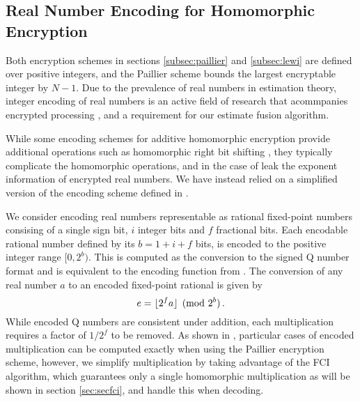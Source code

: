 \documentclass[letterpaper, 10 pt, conference]{ieeeconf}  %
\begin{document}
\subsection{Real Number Encoding for Homomorphic Encryption} \label{subsec:encoding}
Both encryption schemes in sections \ref{subsec:paillier} and \ref{subsec:lewi} are defined over positive integers, and the Paillier scheme bounds the largest encryptable integer by $N-1$. Due to the prevalence of real numbers in estimation theory, integer encoding of real numbers is an active field of research that acommpanies encrypted processing \cite{ziadCryptoImgPrivacyPreserving2016,farokhiSecurePrivateControl2017,cheonHomomorphicEncryptionArithmetic2017}, and a requirement for our estimate fusion algorithm. 

While some encoding schemes for additive homomorphic encryption provide additional operations such as homomorphic right bit shifting \cite{ziadCryptoImgPrivacyPreserving2016}, they typically complicate the homomorphic operations, and in the case of \cite{ziadCryptoImgPrivacyPreserving2016} leak the exponent information of encrypted real numbers. We have instead relied on a simplified version of the encoding scheme defined in \cite{farokhiSecurePrivateControl2017}. 

We consider encoding real numbers representable as rational fixed-point numbers consising of a single sign bit, $i$ integer bits and $f$ fractional bits. Each encodable rational number defined by its $b=1+i+f$ bits, is encoded to the positive integer range $[0,2^b)$. This is computed as the conversion to the signed Q number format \cite{oberstarFixedPointRepresentationFractional2007} and is equivalent to the encoding function from \cite{farokhiSecurePrivateControl2017}. The conversion of any real number $a$ to an encoded fixed-point rational is given by
\begin{equation}
   e = \lfloor{2^f a}\rfloor\pmod{2^b}\,. \label{eqn:qmn}
\end{equation}
While encoded Q numbers are consistent under addition, each multiplication requires a factor of $1/2^f$ to be removed. As shown in \cite{farokhiSecurePrivateControl2017}, particular cases of encoded multiplication can be computed exactly when using the Paillier encryption scheme, however, we simplify multiplication by taking advantage of the FCI algorithm, which guarantees only a single homomorphic multiplication as will be shown in section \ref{sec:secfci}, and handle this when decoding.
\end{document}
